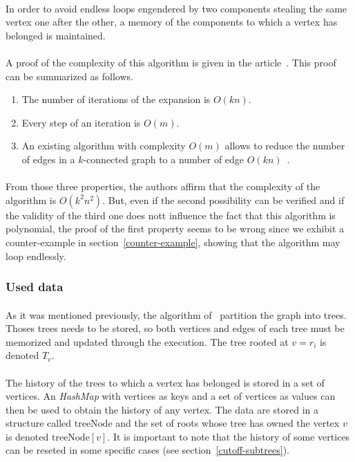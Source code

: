 \paragraph{}
In order to avoid endless loops engendered by two components stealing the same
vertex one after the other, a memory of the components to which a vertex has
belonged is maintained.
\paragraph{}
A proof of the complexity of this algorithm is given in the
article~\cite{JS94}. This proof can be summarized as follows.
\begin{enumerate}
\item The number of iterations of the expansion is $O(kn)$.
\item Every step of an iteration is $O(m)$.
\item An existing algorithm with complexity $O(m)$  allows to
  reduce the number of edges in a $k$-connected graph to a number of edge
  $O(kn)$~\cite{NaIb92}.
\end{enumerate}
\paragraph{}
From those three properties, the authors affirm that the complexity of the
algorithm is $O(k^2n^2)$. But, even if the second possibility can be
verified and if the validity of the third one does nott influence the fact that
this algorithm is polynomial, the proof of the first property seems to be wrong
since we exhibit a counter-example in section~\ref{counter-example}, showing
that the algorithm may loop endlessly.

\subsubsection{Used data}
\paragraph{}
As it was mentioned previously, the algorithm of~\cite{JS94} partition the graph
into trees. Thoses trees needs to be stored, so both vertices and edges of
each tree must be memorized and updated through the execution. The tree rooted
at $v = r_i$ is denoted $T_v$.
\paragraph{}
The history of the trees to which a vertex has belonged is stored in a
set of vertices. An {\em HashMap} with vertices as keys and a set of vertices
as values can then be used to obtain the history of any vertex. The data are
stored in a structure called $\mathrm{treeNode}$ and the set of roots whose
tree has owned the vertex $v$ is denoted $\mathrm{treeNode}[v]$. It is
important to note that the history of some vertices can be reseted in some
specific cases (see section~\ref{cutoff-subtrees}).
